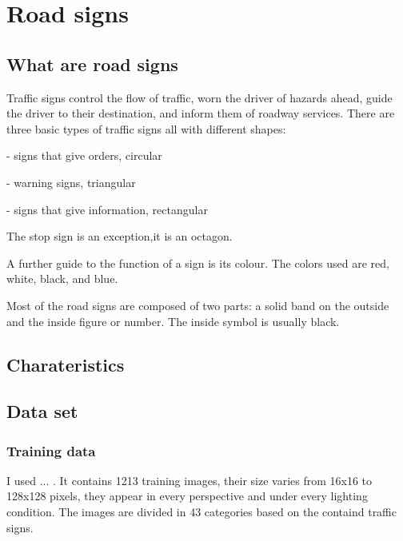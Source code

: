 \chapter{Road signs}\label{ch:SIGNS}

\section{What are road signs}\label{sec:SIGNS:whatAreThey}

Traffic signs control the flow of traffic, worn the driver of hazards ahead, guide the driver to their destination, and inform them of roadway services. There are three basic types of traffic signs all with different shapes: 

- signs that give orders, circular

- warning signs, triangular

- signs that give information, rectangular

The stop sign is an exception,it is an octagon.


A further guide to the function of a sign is its colour. The colors used are red, white, black, and blue. %

Most of the road signs are composed of two parts: a solid band on the outside and the inside figure or number. The inside symbol is usually black. 

\section{Charateristics}\label{sec:SIGNS:character}

\section{Data set}\label{sec:SIGNS:dataSet}

\subsection{Training data}

I used ... . It contains 1213 training images, their size varies from 16x16 to 128x128 pixels, they appear in every perspective and under every lighting condition. The images are divided in 43 categories based on the containd traffic signs.

